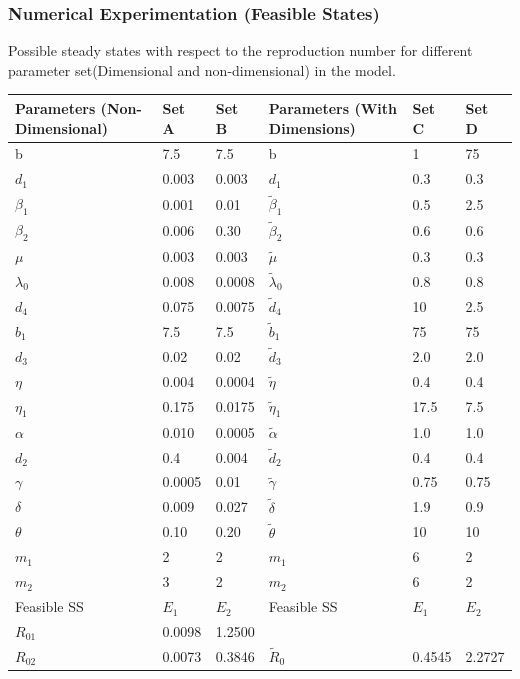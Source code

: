 \documentclass{beamer}
\begin{document}
\begin{frame}\frametitle{Numerical Experimentation (Feasible States)}
Possible steady states with respect to the reproduction number for different parameter
set(Dimensional and non-dimensional) in the model.
\tiny \begin{table}[h]

\label{table:feas}
\begin{tabular}{|p{2.5 cm}|l|l|p{2.5 cm}|l|l|}
\hline
\bf Parameters (Non-Dimensional) & \bf Set A& \bf Set B& \bf Parameters (With Dimensions)& \bf Set C& \bf Set D \\
\hline
b &7.5&7.5&b&1&75\\
$d_1$ &0.003&0.003&$d_1$&0.3&0.3\\
$\beta_1$ &0.001&0.01&$\tilde \beta_1$&0.5&2.5\\
$\beta_2$ &0.006&0.30&$\tilde\beta_2$&0.6&0.6\\
$\mu$ &0.003&0.003&$\tilde\mu$ &0.3&0.3\\
$\lambda_0$ &0.008&0.0008&$\tilde\lambda_0$&0.8&0.8\\
$d_4$ &0.075&0.0075&$\tilde d_4$&10&2.5\\
$b_1$ &7.5&7.5&$\tilde b_1$ &75&75\\
$d_3$ &0.02&0.02&$\tilde d_3$&2.0&2.0\\
$\eta$ &0.004&0.0004&$\tilde\eta$ &0.4&0.4\\
$\eta_1$ &0.175&0.0175&$\tilde\eta_1$&17.5&7.5\\
$\alpha$ &0.010&0.0005&$\tilde\alpha$&1.0&1.0\\
$d_2$ &0.4&0.004&$\tilde d_2$&0.4&0.4\\
$\gamma$ &0.0005&0.01&$\tilde\gamma$ &0.75&0.75\\
$\delta$&0.009&0.027&$\tilde\delta$&1.9&0.9\\
$\theta$ &0.10&0.20&$\tilde\theta$&10&10\\
$m_1$ &2&2&$m_1$&6&2\\
$m_2$ &3&2&$m_2$&6&2\\
\hline
Feasible SS&$E_1$&$E_2$&Feasible SS&$E_1$&$E_2$\\
\hline
$R_{01}$&0.0098&1.2500&&&\\
$R_{02}$&0.0073&0.3846&$\tilde R_{0}$&0.4545&2.2727\\
\hline
\end{tabular}
\end{table}
\end{frame}
\end{document}
